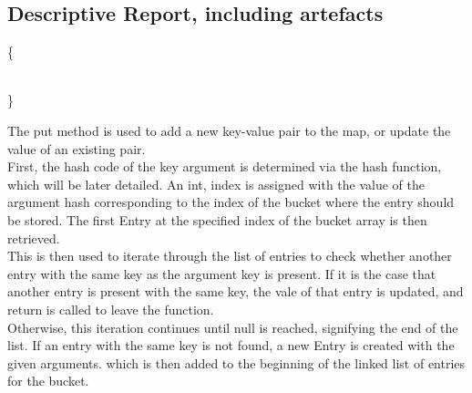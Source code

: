 \documentclass[a4paper]{article}
\begin{document}
\subsection{Descriptive Report, including artefacts}


\vspace{4mm}
\makeatletter
\renewcommand{\ALG@name}{Hashmap Method}
\makeatother
\setcounter{algorithm}{0}

\begin{algorithm}
\caption{}\label{euclid}
\begin{algorithmic}[1]

\algrenewcommand{}
 {\{}
\State{}
\State\quad{}
\State\quad{}
\State\quad{\tt \{ }
\State{}
\State{\tt \{ }
  \State{}

\\
{\}}
\EndProcedure
\end{algorithmic}
\end{algorithm}


The put method is used to add a new key-value pair to the map, 
or update the value of an existing pair. \\

First, the hash code of the key argument is determined via the hash function,
which will be later detailed.
An int, index is assigned with the value of the argument hash
corresponding to the index of the bucket where the entry should be stored.
The first Entry at the specified index of the bucket array is then retrieved. \\

This is then used to iterate through the list of entries to check whether another entry with the same key as the argument key is present.
If it is the case that another entry is present with the same key,
the vale of that entry is updated, and return is called to leave the function. \\

Otherwise, this iteration continues until null is reached, signifying the end of the list.
If an entry with the same key is not found, a new Entry is created with the given arguments. 
which is then added to the beginning of the linked list of entries for the bucket. \\
\end{document}
